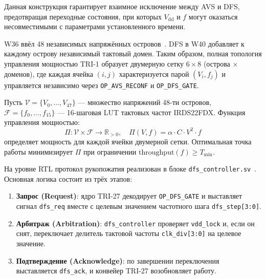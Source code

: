 Данная конструкция гарантирует взаимное исключение между AVS и DFS,
предотвращая переходные состояния, при которых $V_{\mathrm{dd}}$ и $f$
могут оказаться несовместимыми с параметрами установленного времени.


W36 ввёл 48 независимых напряжённых островов~\cite{t27655}.
DFS в W40 добавляет к каждому острову независимый тактовый домен.
Таким образом, полная топология управления мощностью TRI-1 образует
двумерную сетку $6 \times 8$ (острова × доменов), где каждая ячейка $(i, j)$
характеризуется парой $(V_i, f_j)$ и управляется независимо через
\texttt{OP\_AVS\_RECONF} и \texttt{OP\_DFS\_GATE}.

\begin{definition}
\label{def:power-control-grid}
Пусть $\mathcal{V} = \{V_0, \ldots, V_{47}\}$ — множество напряжений
48-ти островов, $\mathcal{F} = \{f_0, \ldots, f_{15}\}$ — 16-шаговая
LUT тактовых частот IRDS22FDX.  Функция управления мощностью:
\[
  \Pi: \mathcal{V} \times \mathcal{F} \to \mathbb{R}_{>0},\quad
  \Pi(V, f) = \alpha \cdot C \cdot V^{2} \cdot f
\]
определяет мощность для каждой ячейки двумерной сетки.
Оптимальная точка работы минимизирует $\Pi$ при ограничении
$\mathrm{throughput}(f) \geq T_{\min}$.
\end{definition}


На уровне RTL протокол рукопожатия реализован в блоке
\texttt{dfs\_controller.sv}~\cite{trinity-fpga140}.
Основная логика состоит из трёх этапов:
\begin{enumerate}
  \item \textbf{Запрос (Request)}: ядро TRI-27 декодирует \texttt{OP\_DFS\_GATE}
        и выставляет сигнал \texttt{dfs\_req} вместе с целевым значением
        частотного шага \texttt{dfs\_step[3:0]}.
  \item \textbf{Арбитраж (Arbitration)}: \texttt{dfs\_controller} проверяет
        \texttt{vdd\_lock} и, если он снят, переключает делитель тактовой
        частоты \texttt{clk\_div[3:0]} на целевое значение.
  \item \textbf{Подтверждение (Acknowledge)}: по завершении переключения
        выставляется \texttt{dfs\_ack}, и конвейер TRI-27 возобновляет работу.
\end{enumerate}

